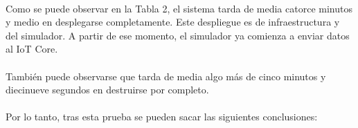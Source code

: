 \documentclass[../../memoria.tex]{subfiles}
\begin{document}


\paragraph{}
Como se puede observar en la Tabla 2, el sistema tarda de media catorce minutos y medio en desplegarse completamente. Este despliegue es de infraestructura y del simulador. A partir de ese momento, el simulador ya comienza a enviar datos al IoT Core.

\paragraph{}
También puede observarse que tarda de media algo más de cinco minutos y diecinueve segundos en destruirse por completo.

\paragraph{}
Por lo tanto, tras esta prueba se pueden sacar las siguientes conclusiones:
\end{document}
